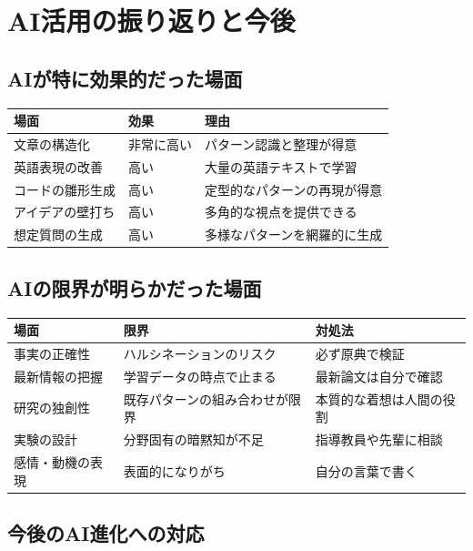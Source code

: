 \section{AI活用の振り返りと今後}

\subsection*{AIが特に効果的だった場面}

\begin{table}[H]
\centering
\small
\begin{tabular}{lll}
\toprule
場面 & 効果 & 理由 \\
\midrule
文章の構造化 & 非常に高い & パターン認識と整理が得意 \\
英語表現の改善 & 高い & 大量の英語テキストで学習 \\
コードの雛形生成 & 高い & 定型的なパターンの再現が得意 \\
アイデアの壁打ち & 高い & 多角的な視点を提供できる \\
想定質問の生成 & 高い & 多様なパターンを網羅的に生成 \\
\bottomrule
\end{tabular}
\end{table}

\subsection*{AIの限界が明らかだった場面}

\begin{table}[H]
\centering
\small
\begin{tabular}{lll}
\toprule
場面 & 限界 & 対処法 \\
\midrule
事実の正確性 & ハルシネーションのリスク & 必ず原典で検証 \\
最新情報の把握 & 学習データの時点で止まる & 最新論文は自分で確認 \\
研究の独創性 & 既存パターンの組み合わせが限界 & 本質的な着想は人間の役割 \\
実験の設計 & 分野固有の暗黙知が不足 & 指導教員や先輩に相談 \\
感情・動機の表現 & 表面的になりがち & 自分の言葉で書く \\
\bottomrule
\end{tabular}
\end{table}

\subsection*{今後のAI進化への対応}

